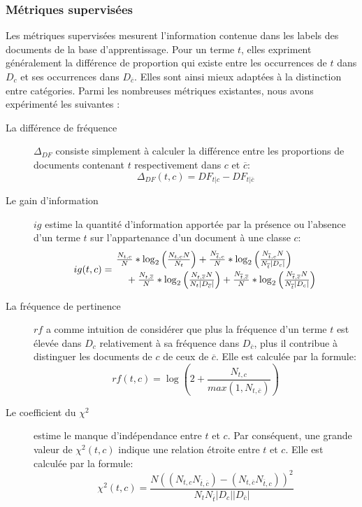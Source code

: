 \subsubsection{Métriques supervisées}
Les métriques supervisées mesurent l'information contenue dans les labels des documents de la base d'apprentissage. Pour un terme $t$, elles expriment généralement la différence de proportion qui existe entre les occurrences de $t$ dans $D_c$ et ses occurrences dans $D_{\overline{c}}$. Elles sont ainsi mieux adaptées à la distinction entre catégories. Parmi les nombreuses métriques existantes, nous avons expérimenté les suivantes : 
\begin{description}
	\item[La différence de fréquence] $\Delta_{DF}$ consiste simplement à calculer la différence entre les proportions de documents contenant $t$ respectivement dans $c$ et $\overline{c}$:
	\[\Delta_{DF}(t,c) = DF_{t \vert c} - DF_{t \vert \overline{c}}\]
	\item[Le gain d'information] $ig$ \citep{yang1997IGandIMandCHIandTS} estime la quantité d'information apportée par la présence ou l'absence d'un terme $t$ sur l'appartenance d'un document à une classe $c$:
	\begin{equation*} %
	ig(t, c) = \splitdfrac{\frac{N_{t,c}}{N} * \log_2 \left(\frac{N_{t,c}N}{N_{t}}\right)
		 + \frac{N_{\overline{t},c}}{N} * \log_2 \left(\frac{N_{\overline{t},c}N}{N_{\overline{t}}\vert D_c \vert}\right)}
	{+ \frac{N_{t,\overline{c}}}{N} * \log_2 \left(\frac{N_{t,\overline{c}}N}{N_{t}\vert D_{\overline{c}}\vert}\right)
	+ \frac{N_{\overline{t},\overline{c}}}{N} * \log_2 \left(\frac{N_{\overline{t},\overline{c}}N}{N_{\overline{t}}\vert D_c \vert}\right)}
	\end{equation*}
	\item[La fréquence de pertinence] $rf$ \citep{lan2009rf} a comme intuition de considérer que  plus la fréquence d'un terme $t$ est élevée dans $D_c$ relativement à sa fréquence dans $D_{\overline{c}}$, plus il contribue à distinguer les documents de $c$ de ceux de $\overline{c}$. Elle est calculée par la formule:
	\[rf(t,c) = \log\left(2 + \frac{N_{t,c}}{max(1, N_{t,\overline{c}})}\right)\]
	\item[Le coefficient du $\chi^2$] \citep{schutze1995chi2} estime le manque d'indépendance entre $t$ et $c$. Par conséquent, une grande valeur de  $\chi^2(t,c)$ indique une relation étroite entre $t$ et $c$. Elle est calculée par la formule:
	\[\chi^2(t,c) = \frac{N ((N_{t,c} N_{\overline{t},\overline{c}}) - (N_{t,\overline{c}} N_{\overline{t},c}))^2}{N_t N_{\overline{t}} \vert D_c \vert  \vert D_{\overline{c}} \vert }\]

\end{description}
